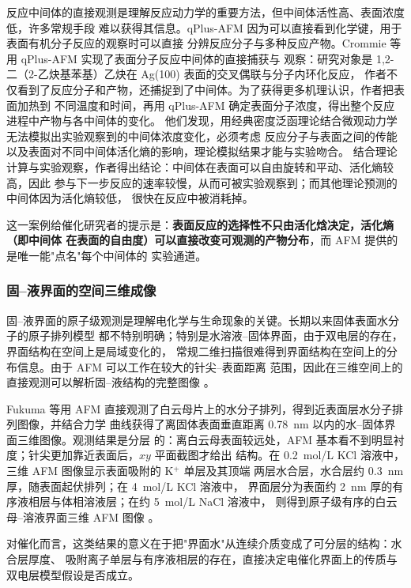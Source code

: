 反应中间体的直接观测是理解反应动力学的重要方法，但中间体活性高、表面浓度低，许多常规手段
难以获得其信息。qPlus-AFM 因为可以直接看到化学键，用于表面有机分子反应的观察时可以直接
分辨反应分子与多种反应产物。Crommie 等用 qPlus-AFM 实现了表面分子反应中间体的直接捕获与
观察：研究对象是 1,2-二（2-乙炔基苯基）乙炔在 Ag(100) 表面的交叉偶联与分子内环化反应，
作者不仅看到了反应分子和产物，还捕捉到了中间体。为了获得更多机理认识，作者把表面加热到
不同温度和时间，再用 qPlus-AFM 确定表面分子浓度，得出整个反应进程中产物与各中间体的变化。
他们发现，用经典密度泛函理论结合微观动力学无法模拟出实验观察到的中间体浓度变化，必须考虑
反应分子与表面之间的传能以及表面对不同中间体活化熵的影响，理论模拟结果才能与实验吻合。
结合理论计算与实验观察，作者得出结论：中间体在表面可以自由旋转和平动、活化熵较高，因此
参与下一步反应的速率较慢，从而可被实验观察到；而其他理论预测的中间体因为活化熵较低，
很快在反应中被消耗掉。

这一案例给催化研究者的提示是：\textbf{表面反应的选择性不只由活化焓决定，活化熵（即中间体
在表面的自由度）可以直接改变可观测的产物分布}，而 AFM 提供的是唯一能"点名"每个中间体的
实验通道。

\subsubsection{固--液界面的空间三维成像}

固--液界面的原子级观测是理解电化学与生命现象的关键。长期以来固体表面水分子的原子排列模型
都不特别明确；特别是水溶液--固体界面，由于双电层的存在，界面结构在空间上是局域变化的，
常规二维扫描很难得到界面结构在空间上的分布信息。由于 AFM 可以工作在较大的针尖--表面距离
范围，因此在三维空间上的直接观测可以解析固--液结构的完整图像
。

Fukuma 等用 AFM 直接观测了白云母片上的水分子排列，得到近表面层水分子排列图像，并结合力学
曲线获得了离固体表面垂直距离 \qty{0.78}{nm} 以内的水--固体界面三维图像。观测结果是分层
的：离白云母表面较远处，AFM 基本看不到明显衬度；针尖更加靠近表面后，$xy$ 平面截图才给出
结构。在 \qty{0.2}{mol/L} KCl 溶液中，三维 AFM 图像显示表面吸附的 K$^{+}$ 单层及其顶端
两层水合层，水合层约 \qty{0.3}{nm} 厚，随表面起伏排列；在 \qty{4}{mol/L} KCl 溶液中，
界面层分为表面约 \qty{2}{nm} 厚的有序液相层与体相溶液层；在约 \qty{5}{mol/L} NaCl 溶液中，
则得到原子级有序的白云母--溶液界面三维 AFM 图像
。

对催化而言，这类结果的意义在于把"界面水"从连续介质变成了可分层的结构：水合层厚度、
吸附离子单层与有序液相层的存在，直接决定电催化界面上的传质与双电层模型假设是否成立。

